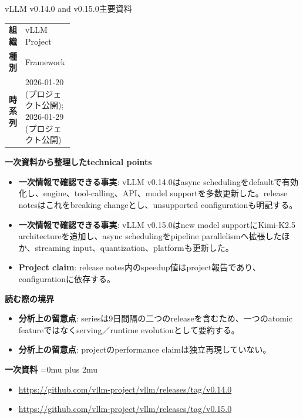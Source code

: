 \begin{technicalnote}{vLLM v0.14.0 and v0.15.0}{主要資料}
\begingroup
\begin{tabularx}{\linewidth}{@{}>{\bfseries}p{0.22\linewidth}X@{}}
組織 & vLLM Project \\
種別 & Framework \\
時系列 & 2026-01-20 (プロジェクト公開); 2026-01-29 (プロジェクト公開) \\
\end{tabularx}
\smallskip
{\bfseries 一次資料から整理したtechnical points}
\begin{itemize}[leftmargin=1.5em,itemsep=0.35em]
\item \textbf{一次情報で確認できる事実}: vLLM v0.14.0はasync schedulingをdefaultで有効化し、engine、tool-calling、API、model supportを多数更新した。release notesはこれをbreaking changeとし、unsupported configurationも明記する。
\item \textbf{一次情報で確認できる事実}: vLLM v0.15.0はnew model supportにKimi-K2.5 architectureを追加し、async schedulingをpipeline parallelismへ拡張したほか、streaming input、quantization、platformも更新した。
\item \textbf{Project claim}: release notes内のspeedup値はproject報告であり、configurationに依存する。
\end{itemize}
\begin{minipage}{\linewidth}
{\bfseries 読む際の境界}
\begin{itemize}[leftmargin=1.5em,itemsep=0.35em]
\item \textbf{分析上の留意点}: seriesは9日間隔の二つのreleaseを含むため、一つのatomic featureではなくserving／runtime evolutionとして要約する。
\item \textbf{分析上の留意点}: projectのperformance claimは独立再現していない。
\end{itemize}
\begin{samepage}
{\bfseries 一次資料}
\begingroup\sloppy
\Urlmuskip=0mu plus 2mu\relax
\begin{itemize}[leftmargin=1.5em,itemsep=0.25em]
\item {\scriptsize\url{https://github.com/vllm-project/vllm/releases/tag/v0.14.0}}
\item {\scriptsize\url{https://github.com/vllm-project/vllm/releases/tag/v0.15.0}}
\end{itemize}
\endgroup
\end{samepage}
\end{minipage}
\endgroup
\end{technicalnote}
\medskip

